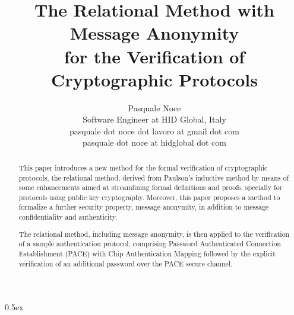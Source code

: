 \documentclass[11pt,a4paper,fleqn]{article}
\begin{document}
\title{The Relational Method with Message Anonymity\\for the Verification of Cryptographic Protocols}
\author{Pasquale Noce\\Software Engineer at HID Global, Italy\\pasquale dot noce dot lavoro at gmail dot com\\pasquale dot noce at hidglobal dot com}
\maketitle

\begin{abstract}
This paper introduces a new method for the formal verification of cryptographic protocols, the
relational method, derived from Paulson's inductive method by means of some enhancements aimed at
streamlining formal definitions and proofs, specially for protocols using public key cryptography.
Moreover, this paper proposes a method to formalize a further security property, message anonymity,
in addition to message confidentiality and authenticity.

The relational method, including message anonymity, is then applied to the verification of a sample
authentication protocol, comprising Password Authenticated Connection Establishment (PACE) with Chip
Authentication Mapping followed by the explicit verification of an additional password over the PACE
secure channel.
\end{abstract}

\tableofcontents

\parindent 0pt\parskip 0.5ex





\end{document}
